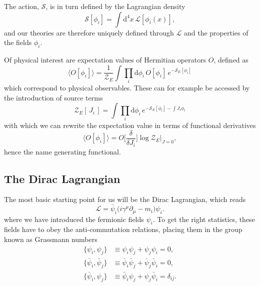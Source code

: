 The action, $\mathcal{S}$, is in turn defined by the Lagrangian density
%
\begin{equation} \label{eq-action-def}
  \mathcal{S}[\phi_i] = \int \mathrm{d}^4 x\, \mathcal{L}[\phi_i(x)],
\end{equation}
%
and our theories are therefore uniquely defined through $\mathcal{L}$ and the
properties of the fields $\phi_i$.

Of physical interest are expectation values of Hermitian operators $O$, defined
as
%
\begin{equation} \label{eq-expectation_value}
  \big\langle O[\phi_i] \big\rangle = \frac{1}{\mathcal{Z}_E} 
    \int \prod_i \mathrm{d} \phi_i \, O[\phi_i]\, e^{-\mathcal{S}_E[\phi_i]}
\end{equation}
%
which correspond to physical observables. These can for example be accessed by
the introduction of source terms
%
%
\begin{equation}
  \mathcal{Z}_E [\,J_i\,] = \int \prod_i \mathrm{d} \phi_i \,
    e^{-\mathcal{S}_E[\phi_i] - \int J_i \phi_i}
\end{equation}
%
with which we can rewrite the expectation value in terms of functional
derivatives
%
\begin{equation}
  \big\langle O[\phi_i] \big\rangle = O\bigg[ \frac{\delta}{\delta J_i} \bigg]
    \log \mathcal{Z}_E \bigg|_{J=0},
\end{equation}
%
hence the name generating functional.

\subsection{The Dirac Lagrangian}

The most basic starting point for us will be the Dirac Lagrangian, which reads
%
\begin{equation}
  \mathcal{L} = \bar{\psi}_i \big(i\gamma^{\mu} \partial_{\mu} - m_i\big)
  \psi_i. \label{eq-ldirac}
\end{equation}
%
where we have introduced the fermionic fields $\psi_i$. To get the right
statistics, these fields have to obey the anti-commutation relations, placing
them in the group known as Grassmann numbers
%
\begin{align}
  \big\{ \psi_i, \psi_j \big\} &\equiv \psi_i \psi_j + \psi_j \psi_i = 0,\\
  \big\{ \bar{\psi}_i, \bar{\psi}_j \big\} &\equiv \bar{\psi}_i \bar{\psi}_j +
    \bar{\psi}_j \bar{\psi}_i = 0,\\
  \big\{ \bar{\psi}_i, \psi_j \big\} &\equiv \bar{\psi}_i \psi_j + \psi_j
    \bar{\psi}_i = \delta_{ij}.
\end{align}

